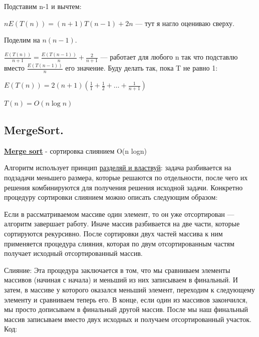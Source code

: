 \documentclass{article}
\newcommand{\deff}[1]{\underline{\textbf{#1}}}
\begin{document}
Подставим n-1 и вычтем:

$nE(T(n))=(n+1) T(n-1) +2n$ --- тут я нагло оцениваю сверху. 

Поделим на $n(n-1).$

$\displaystyle \frac{E(T(n))}{n+1}=\frac{E(T(n-1))}{n}+\frac{2}{n+1}$ ---  работает для любого n так что подставлю вместо  $\displaystyle \frac{E(T(n-1))}{n}$ его значение. Буду делать так, пока T не равно 1:

$E(T(n)) = 2(n+1)(\frac{1}{1}+\frac{1}{2}+\ldots + \frac{1}{n+1})$

$T(n) = O(n\log n)$

\subsection*{MergeSort.}

\deff{Merge sort} - сортировка слиянием O(n logn)

Алгоритм использует принцип \uline{разделяй и властвуй}: задача разбивается на подзадачи меньшего размера, которые решаются по отдельности, после чего их решения комбинируются для получения решения исходной задачи. Конкретно процедуру сортировки слиянием можно описать следующим образом:

Если в рассматриваемом массиве один элемент, то он уже отсортирован ---алгоритм завершает работу.
Иначе массив разбивается на две части, которые сортируются рекурсивно.
После сортировки двух частей массива к ним применяется процедура слияния, которая по двум отсортированным частям получает исходный отсортированный массив.

Слияние:
Эта процедура заключается в том, что мы сравниваем элементы массивов (начиная с начала) и меньший из них записываем в финальный. И затем, в массиве у которого оказался меньший элемент, переходим к следующему элементу и сравниваем теперь его. В конце, если один из массивов закончился, мы просто дописываем в финальный другой массив. После мы наш финальный массив записываем вместо двух исходных и получаем отсортированный участок.
Код:
\end{document}
